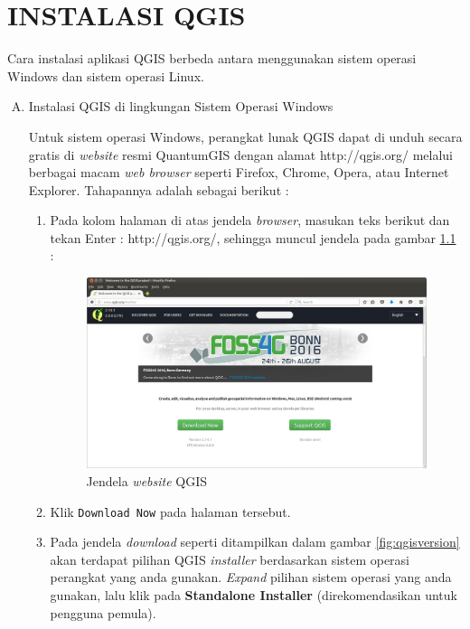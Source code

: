 \chapter{INSTALASI QGIS}

Cara instalasi aplikasi QGIS berbeda antara menggunakan sistem operasi Windows dan sistem operasi Linux.

\begin{enumerate}[A.]

\item Instalasi QGIS di lingkungan Sistem Operasi Windows

Untuk sistem operasi Windows, perangkat lunak QGIS dapat di unduh secara gratis di \textit{website} resmi QuantumGIS dengan alamat http://qgis.org/ melalui berbagai macam \textit{web browser} seperti Firefox, Chrome, Opera, atau Internet Explorer. Tahapannya adalah sebagai berikut :

\begin{enumerate}[1.]

\item Pada kolom halaman di atas jendela \textit{browser}, masukan teks berikut dan tekan Enter : http://qgis.org/, sehingga muncul jendela pada gambar \ref{fig:qgishomepage} :

\begin{figure}
  \centering
  \includegraphics[width=1\textwidth]{./resources/001-homepage-qgis}
  \caption{Jendela \textit{website} QGIS}
  \label{fig:qgishomepage}
\end{figure}

\item Klik \verb|Download Now| pada halaman tersebut.

\item Pada jendela \textit{download} seperti ditampilkan dalam gambar \ref{fig:qgisversion} akan terdapat pilihan QGIS \textit{installer} berdasarkan sistem operasi perangkat yang anda gunakan. \textit{Expand} pilihan sistem operasi yang anda gunakan, lalu klik pada \textbf{Standalone Installer} (direkomendasikan untuk pengguna pemula).


\end{enumerate}
\end{enumerate}
